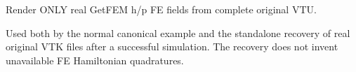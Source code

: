 \documentclass[letterpaper,10pt,english]{sphinxmanual}
\begin{document}
\begin{fulllineitems}

\pysigstartsignatures
\pysiglinewithargsret
{}
{\sphinxparamcomma {}\sphinxparamcomma {}\sphinxparamcomma {}\sphinxparamcomma {}\sphinxparamcomma {}\sphinxparamcomma {}}
{}
\pysigstopsignatures
\sphinxAtStartPar
Render ONLY real GetFEM h/p FE fields from complete original VTU.

\sphinxAtStartPar
Used both by the normal canonical example and the standalone
recovery of real original VTK files after a successful simulation.
The recovery does not invent unavailable FE Hamiltonian quadratures.

\end{fulllineitems}
\end{document}
